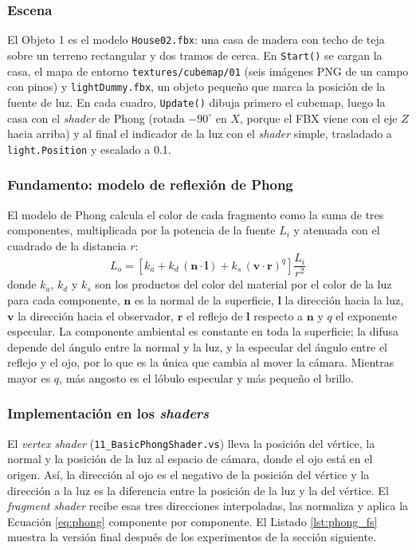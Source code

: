 \subsubsection{Escena}
El Objeto 1 es el modelo \texttt{House02.fbx}: una casa de madera con techo de teja sobre un terreno rectangular y dos tramos de cerca. En \texttt{Start()} se cargan la casa, el mapa de entorno \texttt{textures/cubemap/01} (seis imágenes PNG de un campo con pinos) y \texttt{lightDummy.fbx}, un objeto pequeño que marca la posición de la fuente de luz. En cada cuadro, \texttt{Update()} dibuja primero el cubemap, luego la casa con el \textit{shader} de Phong (rotada $-90^\circ$ en $X$, porque el FBX viene con el eje $Z$ hacia arriba) y al final el indicador de la luz con el \textit{shader} simple, trasladado a \texttt{light.Position} y escalado a 0.1.

\subsubsection{Fundamento: modelo de reflexión de Phong}
El modelo de Phong calcula el color de cada fragmento como la suma de tres componentes, multiplicada por la potencia de la fuente $L_i$ y atenuada con el cuadrado de la distancia $r$:
\begin{equation}
    L_o = \left[ k_a + k_d\,(\mathbf{n} \cdot \mathbf{l}) + k_s\,(\mathbf{v} \cdot \mathbf{r})^q \right] \frac{L_i}{r^2}
    \label{eq:phong}
\end{equation}
donde $k_a$, $k_d$ y $k_s$ son los productos del color del material por el color de la luz para cada componente, $\mathbf{n}$ es la normal de la superficie, $\mathbf{l}$ la dirección hacia la luz, $\mathbf{v}$ la dirección hacia el observador, $\mathbf{r}$ el reflejo de $\mathbf{l}$ respecto a $\mathbf{n}$ y $q$ el exponente especular. La componente ambiental es constante en toda la superficie; la difusa depende del ángulo entre la normal y la luz, y la especular del ángulo entre el reflejo y el ojo, por lo que es la única que cambia al mover la cámara. Mientras mayor es $q$, más angosto es el lóbulo especular y más pequeño el brillo.

\subsubsection{Implementación en los \textit{shaders}}
El \textit{vertex shader} (\texttt{11\_BasicPhongShader.vs}) lleva la posición del vértice, la normal y la posición de la luz al espacio de cámara, donde el ojo está en el origen. Así, la dirección al ojo es el negativo de la posición del vértice y la dirección a la luz es la diferencia entre la posición de la luz y la del vértice. El \textit{fragment shader} recibe esas tres direcciones interpoladas, las normaliza y aplica la Ecuación \ref{eq:phong} componente por componente. El Listado \ref{lst:phong_fs} muestra la versión final después de los experimentos de la sección siguiente.

